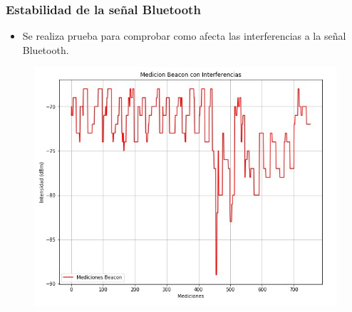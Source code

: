 \documentclass[mathserif]{beamer}
\begin{document}

\begin{frame}
\frametitle{Estabilidad de la señal Bluetooth}

\begin{itemize}
\item Se realiza prueba para comprobar como afecta las interferencias a la señal Bluetooth.

\end{itemize}

\begin{figure}
\includegraphics[width=.7\textheight]{../figures/mediciones_beacon_interferencia.jpg}
\end{figure}

\end{frame}

\end{document}
